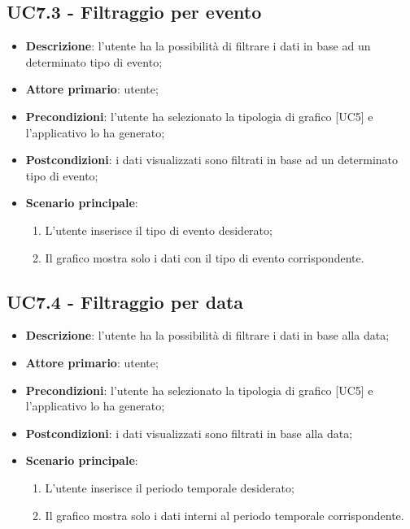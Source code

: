 \subsection{UC7.3 - Filtraggio per evento}
\begin{itemize}
  \item \textbf{Descrizione}: l'utente ha la possibilità di filtrare i dati in base ad un determinato tipo di evento;
  \item \textbf{Attore primario}: utente;
  \item \textbf{Precondizioni}: l'utente ha selezionato la tipologia di grafico [UC5] e l'applicativo lo ha generato;
  \item \textbf{Postcondizioni}: i dati visualizzati sono filtrati in base ad un determinato tipo di evento;
  \item \textbf{Scenario principale}:
    \begin{enumerate}
      \item L'utente inserisce il tipo di evento desiderato;
      \item Il grafico mostra solo i dati con il tipo di evento corrispondente.
    \end{enumerate}
\end{itemize}

\subsection{UC7.4 - Filtraggio per data}
\begin{itemize}
  \item \textbf{Descrizione}: l'utente ha la possibilità di filtrare i dati in base alla data;
  \item \textbf{Attore primario}: utente;
  \item \textbf{Precondizioni}: l'utente ha selezionato la tipologia di grafico [UC5] e l'applicativo lo ha generato;
  \item \textbf{Postcondizioni}: i dati visualizzati sono filtrati in base alla data;
  \item \textbf{Scenario principale}:
    \begin{enumerate}
      \item L'utente inserisce il periodo temporale desiderato;
      \item Il grafico mostra solo i dati interni al periodo temporale corrispondente.
    \end{enumerate}
\end{itemize}

